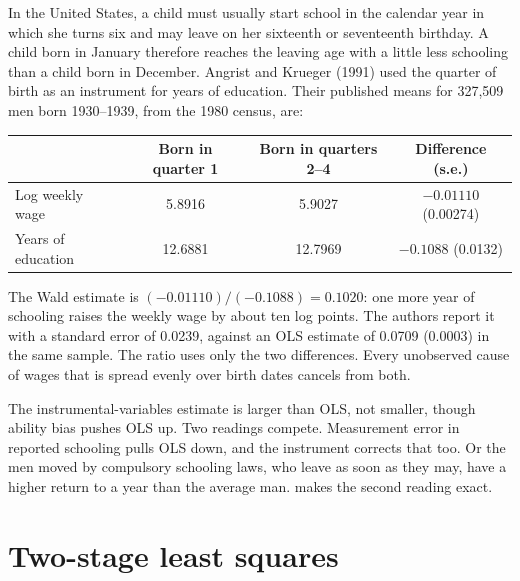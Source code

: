 \begin{example}\label{ex:b3:instrumental-variables:ak}
In the United States, a child must usually start school in the calendar year
in which she turns six and may leave on her sixteenth or seventeenth birthday.
A child born in January therefore reaches the leaving age with a little less
schooling than a child born in December. Angrist and Krueger (1991) used the
quarter of birth as an instrument for years of education. Their published
means for 327{,}509 men born 1930--1939, from the 1980 census, are:
\begin{center}
\begin{tabular}{lccc}
  & Born in quarter 1 & Born in quarters 2--4 & Difference (s.e.) \\ \hline
  Log weekly wage & 5.8916 & 5.9027 & $-0.01110$ (0.00274) \\
  Years of education & 12.6881 & 12.7969 & $-0.1088$ (0.0132) \\ \hline
\end{tabular}
\end{center}
The Wald estimate is $(-0.01110)/(-0.1088) = 0.1020$: one more year of
schooling raises the weekly wage by about ten log points. The authors report
it with a standard error of 0.0239, against an OLS estimate of 0.0709 (0.0003)
in the same sample. %
The ratio uses only the two differences. Every unobserved cause of wages that
is spread evenly over birth dates cancels from both.
\end{example}

The instrumental-variables estimate is larger than OLS, not smaller, though
ability bias pushes OLS up. Two readings compete. Measurement error in
reported schooling pulls OLS down, and the instrument corrects that too. Or
the men moved by compulsory schooling laws, who leave as soon as they may,
have a higher return to a year than the average man.
 makes the second reading exact.

\section{Two-stage least squares}\label{sec:b3:instrumental-variables:tsls}

